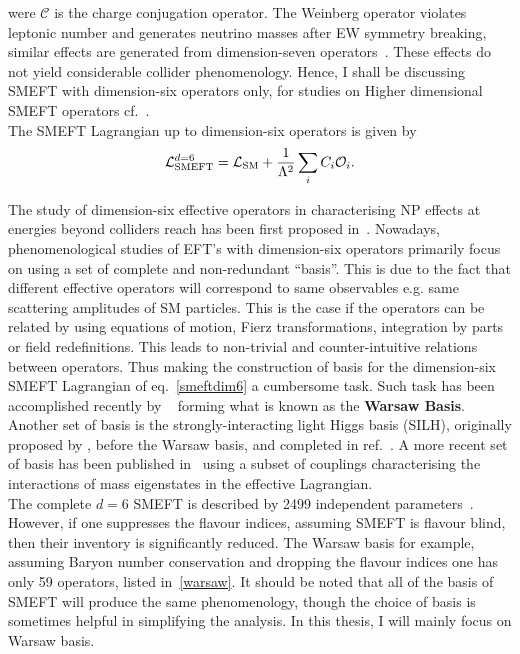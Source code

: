 were $ \mathcal{C}$ is the charge conjugation operator. The Weinberg operator violates leptonic number and generates neutrino masses after EW symmetry breaking, similar effects are generated from dimension-seven operators~\cite{Lehman:2014jma}. These effects do not yield considerable collider phenomenology. Hence, I shall be discussing SMEFT with dimension-six operators only, for studies on Higher dimensional SMEFT operators cf.~\cite{Lehman:2014jma,Lehman:2015coa,Henning:2015alf,Aguilar-Saavedra:2010uur}. \\ The SMEFT Lagrangian up to dimension-six operators is given by
\begin{equation}
	\mathcal{L}_{\mathrm{SMEFT}}^{d=6}=\mathcal{L}_{\mathrm{SM}} + \frac{1}{\Lambda^2}\sum_i C_i  {\cal O}_i.
	\label{smeftdim6}
\end{equation}

The study of dimension-six effective operators in characterising NP effects at energies beyond colliders reach has been first proposed in~\cite{BUCHMULLER1986621,Hagiwara:1993ck}. Nowadays,  phenomenological studies of EFT's with dimension-six operators primarily focus on using a set of complete and non-redundant ``basis''. This is due to the fact that different effective operators will correspond to same observables e.g. same scattering amplitudes of SM particles.  This is the case if the operators can be related by using equations of motion, Fierz transformations, integration by parts or field redefinitions. This leads to non-trivial and counter-intuitive relations between operators. Thus making the construction of basis for the dimension-six SMEFT Lagrangian of eq.~\eqref{smeftdim6} a cumbersome task. Such task has been accomplished recently by ~\cite{Grzadkowski:2010es,Alonso:2013hga} forming what is known as the \textbf{Warsaw Basis}.  Another set of basis is the strongly-interacting light Higgs basis (SILH), originally proposed by \cite{Giudice:2007fh}, before the Warsaw basis, and completed in ref.~\cite{Contino:2013kra, Elias-Miro:2013eta}. A more recent set of basis has been published in~\cite{Gupta:2014rxa} using a subset of couplings characterising the interactions of mass eigenstates in the effective Lagrangian.\\
The complete $d=6$ SMEFT is described by 2499 independent parameters~\cite{Alonso:2013hga}. However, if one suppresses the flavour indices, assuming SMEFT is flavour blind, then their inventory is significantly reduced. The Warsaw basis for example, assuming Baryon number conservation and dropping the flavour indices one has only 59 operators, listed in~\autoref{warsaw}. It should be noted that all of the basis of SMEFT will produce the same phenomenology, though the choice of basis is sometimes helpful in simplifying the analysis. In this thesis, I will mainly focus on Warsaw basis.\\ 
